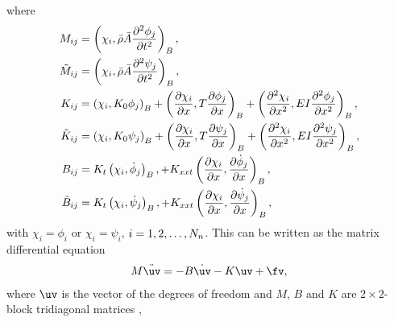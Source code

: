 \documentclass[11pt]{article}
\newcommand{\rhos}{\bar{\rho}}
\newcommand{\As}{\bar{A}}
\begin{document}
where 
\begin{align}
  M_{ij} &= \left( \chi_i,  \rhos \As \frac{\partial^2 \phi_j}{\partial t^2} \right)_B , \\
  \Mt_{ij} &= \left( \chi_i,  \rhos \As \frac{\partial^2 \psi_j}{\partial t^2} \right)_B , \\
% 
  K_{ij} &= 
             \left( \chi_i , K_0 \phi_j \right)_B
            + \left( \frac{\partial \chi_i}{\partial x} , T \frac{\partial \phi_j}{\partial x} \right)_B
               + \left(\frac{\partial^2 \chi_i}{\partial x^2}, E I \frac{\partial^2 \phi_j}{\partial x^2}\right)_B, \\
  \Kt_{ij} &= \left( \chi_i , K_0 \psi_j \right)_B
                + \left( \frac{\partial \chi_i}{\partial x} , T \frac{\partial \psi_j}{\partial x} \right)_B
                + \left(\frac{\partial^2 \chi_i}{\partial x^2}, E I \frac{\partial^2 \psi_j}{\partial x^2}\right)_B, \\
% 
  B_{ij} &=  K_t \left( \chi_i , \dot\phi_j \right)_B, 
            + K_{xxt} \left( \frac{\partial \chi_i}{\partial x} , \frac{\partial \dot\phi_j}{\partial x} \right)_B, \\
  \Bt_{ij} &=  K_t \left( \chi_i , \dot\psi_j \right)_B, 
            + K_{xxt} \left( \frac{\partial \chi_i}{\partial x} , \frac{\partial \dot\psi_j}{\partial x} \right)_B, 
\end{align}
with $\chi_i=\phi_i$ or $\chi_i=\psi_i$, $i=1,2,\ldots,N_n$.
This can be written as the matrix differential equation
\begin{align}
   M \ddot\uv = - B \dot\uv - K \uv + \fv , \label{eq:beamODE}
\end{align}
where $\uv$ is the vector of the degrees of freedom and 
$M$, $B$ and $K$ are $2\times2$-block tridiagonal matrices , 
\end{document}
